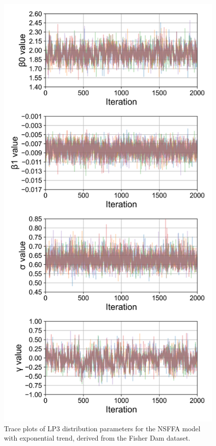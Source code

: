 \begin{figure}[H]
    \centering
    \includegraphics[width=1\linewidth]{_plots/OCD_exponential_mu_posterior_trace_lp3.png}
    \caption{Trace plots of LP3 distribution parameters for the NSFFA model with exponential trend, derived from the Fisher Dam dataset.}
    \label{fig:OCD_exponential_mu_posterior_trace_lp3}
\end{figure}

